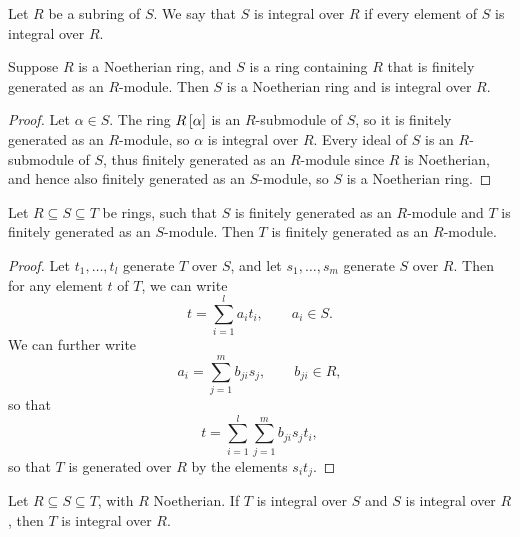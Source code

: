 \begin{definition}
Let $ R $ be a subring of $ S $. We say that $ S $ is integral over $ R $ if every element of $ S $ is integral over $ R $.
\end{definition}

\begin{proposition}
Suppose $ R $ is a Noetherian ring, and $ S $ is a ring containing $ R $ that is finitely generated as an $ R $-module. Then $ S $ is a Noetherian ring and is integral over $ R $.
\end{proposition}

\begin{proof}
Let $ \alpha \in S $. The ring $ R\sb{\alpha} $ is an $ R $-submodule of $ S $, so it is finitely generated as an $ R $-module, so $ \alpha $ is integral over $ R $. Every ideal of $ S $ is an $ R $-submodule of $ S $, thus finitely generated as an $ R $-module since $ R $ is Noetherian, and hence also finitely generated as an $ S $-module, so $ S $ is a Noetherian ring.
\end{proof}

\begin{lemma}
\label{lem:10.1.6}
Let $ R \subseteq S \subseteq T $ be rings, such that $ S $ is finitely generated as an $ R $-module and $ T $ is finitely generated as an $ S $-module. Then $ T $ is finitely generated as an $ R $-module.
\end{lemma}

\begin{proof}
Let $ t_1, \dots, t_l $ generate $ T $ over $ S $, and let $ s_1, \dots, s_m $ generate $ S $ over $ R $. Then for any element $ t $ of $ T $, we can write
$$ t = \sum_{i = 1}^l a_it_i, \qquad a_i \in S. $$
We can further write
$$ a_i = \sum_{j = 1}^m b_{ji}s_j, \qquad b_{ji} \in R, $$
so that
$$ t = \sum_{i = 1}^l \sum_{j = 1}^m b_{ji}s_jt_i, $$
so that $ T $ is generated over $ R $ by the elements $ s_it_j $.
\end{proof}

\begin{corollary}
Let $ R \subseteq S \subseteq T $, with $ R $ Noetherian. If $ T $ is integral over $ S $ and $ S $ is integral over $ R $, then $ T $ is integral over $ R $.
\end{corollary}

